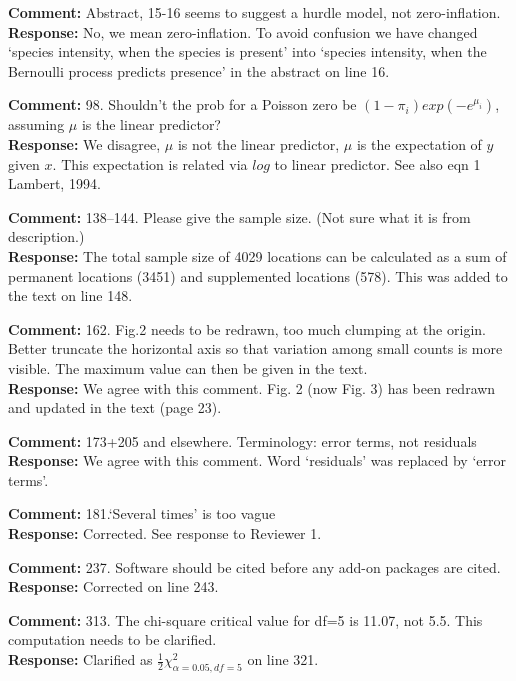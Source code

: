\documentclass{letter}
\begin{document}
\begin{letter}
\textbf{Comment:} 
Abstract, 15-16 seems to suggest a hurdle model, not zero-inflation.\\
\textbf{Response:} No, we mean zero-inflation. To avoid confusion we have changed `species intensity, when the species is present' into `species intensity, when the Bernoulli process predicts presence' in the abstract on line 16. 


\textbf{Comment:} 
98. Shouldn't the prob for a Poisson zero be $(1-\pi_{i})exp(-e^{\mu_{i}})$, assuming $\mu$ is the linear predictor?\\
\textbf{Response:} We disagree, $\mu$ is not the linear predictor, $\mu$ is the expectation of $y$ given $x$. This expectation is related via $log$ to linear predictor.  See also eqn 1 Lambert, 1994.

\textbf{Comment:} 
138--144. Please give the sample size. (Not sure what it is from description.)\\
\textbf{Response:} The total sample size of 4029 locations can be calculated as a sum of permanent locations (3451) and supplemented locations (578). This was added to the text on line 148.


\textbf{Comment:} 
162. Fig.2 needs to be redrawn, too much clumping at the origin. Better truncate the horizontal axis so that variation among small counts is more visible. The maximum value can then be given in the text.\\
\textbf{Response:} We agree with this comment. Fig. 2 (now Fig. 3)  has been redrawn and updated in the text (page 23).

\textbf{Comment:} 
173+205 and elsewhere. Terminology: error terms, not residuals\\
\textbf{Response:} We agree with this comment. Word `residuals' was replaced by `error terms'.

\textbf{Comment:} 
181.`Several times' is too vague\\
\textbf{Response:} Corrected. See response to Reviewer 1.

\textbf{Comment:} 
237. Software should be cited before any add-on packages are cited.\\
\textbf{Response:} Corrected on line 243.

\textbf{Comment:} 
313. The chi-square critical value for df=5 is 11.07, not 5.5. This computation needs to be clarified.\\
\textbf{Response:} Clarified as $\frac{1}{2}\chi^2_{\alpha=0.05, df=5}$ on line 321.


\end{letter}
\end{document}
